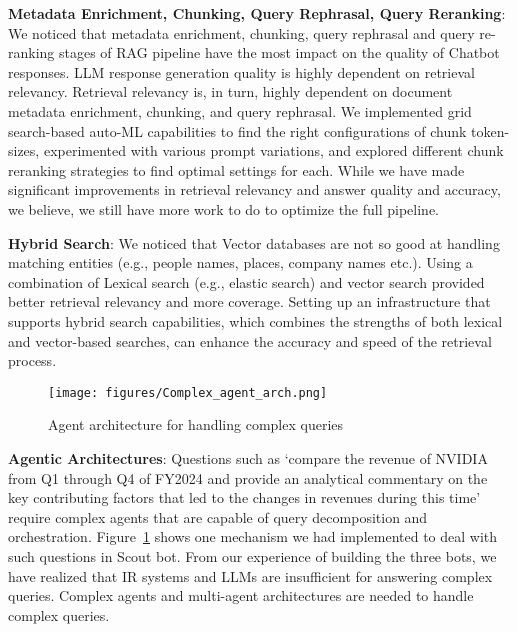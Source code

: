 \documentclass[sigconf]{acmart}
\begin{document}
\noindent \textbf{Metadata Enrichment, Chunking, Query Rephrasal, Query Reranking}: We noticed that metadata enrichment, chunking, query rephrasal and query re-ranking stages of RAG pipeline have the most impact on the quality of Chatbot responses. LLM response generation quality is highly dependent on retrieval relevancy. Retrieval relevancy is, in turn, highly dependent on document metadata enrichment, chunking, and query rephrasal. We implemented grid search-based auto-ML capabilities to find the right configurations of chunk token-sizes, experimented with various prompt variations, and explored different chunk reranking strategies to find optimal settings for each. While we have made significant improvements in retrieval relevancy and answer quality and accuracy, %
we believe, we still have more work to do to optimize the full pipeline.

\noindent \textbf{Hybrid Search}: We noticed that Vector databases are not so good at handling matching entities (e.g., people names, places, company names etc.). Using a combination of Lexical search (e.g., elastic search) and vector search provided better retrieval relevancy and more coverage. Setting up an infrastructure that supports hybrid search capabilities, which combines the strengths of both lexical and vector-based searches, can enhance the accuracy and speed of the retrieval process. 


\begin{figure}[tp!]
    \centering
    \texttt{[image: figures/Complex\_agent\_arch.png]}
    \vspace{-3mm}
    \caption{Agent architecture for handling complex queries}
    \vspace{-3mm}
    \label{fig:complx_agent_arch}
\end{figure}

\noindent \textbf{Agentic Architectures}:  Questions such as ‘compare the revenue of NVIDIA from Q1 through Q4 of FY2024 and provide an analytical commentary on the key contributing factors that led to the changes in revenues during this time’ require complex agents that are capable of query decomposition and orchestration. Figure~\ref{fig:complx_agent_arch} shows one mechanism we had implemented to deal with such questions in Scout bot. From our experience of building the three bots, we have realized that IR systems and LLMs are insufficient for answering complex queries. Complex agents and multi-agent architectures are needed to handle complex queries. 
\end{document}
